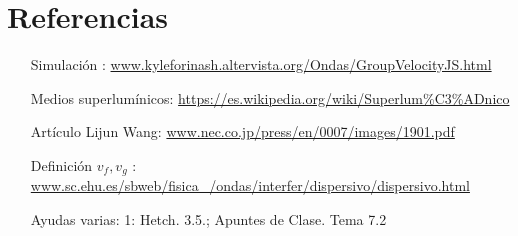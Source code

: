\documentclass[a4paper]{article}
\begin{document}
\section{Referencias}
\begin{itemize}
    \item[Simulación]: \url{www.kyleforinash.altervista.org/Ondas/GroupVelocityJS.html}
    \item[Medios superlumínicos:] \url{https://es.wikipedia.org/wiki/Superlum\%C3\%ADnico}
    \item[Artículo Lijun Wang:] \url{www.nec.co.jp/press/en/0007/images/1901.pdf}
    \item[Definición $v_f, v_g$]: \url{www.sc.ehu.es/sbweb/fisica_/ondas/interfer/dispersivo/dispersivo.html }
    \item[Ayudas varias:] 1: Hetch. 3.5.; Apuntes de Clase. Tema 7.2
\end{itemize}
\end{document}
